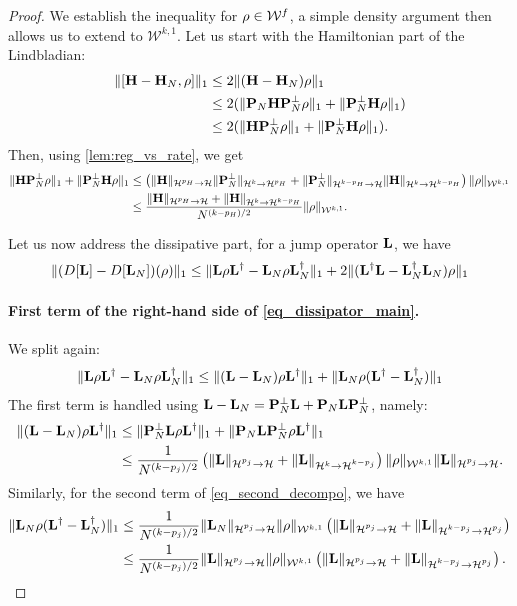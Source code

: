 \documentclass[10pt,a4paper]{amsart}
\newcommand{\oH}{{\bf H}}
\newcommand{\oL}{{\bf L}}
\newcommand{\oP}{{\bf P}}
\newcommand{\orho}{{\bf \rho}}
\newcommand{\xH}{\mathcal{H}}
\newcommand{\xW}{\mathcal{W}}
\begin{document}
\begin{proof}
    We establish the inequality for $\orho\in \xW^f$, a simple density argument then allows us to extend to $\xW^{k,1}$. Let us start with the Hamiltonian part of the Lindbladian:
    \begin{align}
        \|[\oH-\oH_N,\orho]\|_1 &\leq 2 \| (\oH-\oH_N)\orho\|_1\\
        & \leq 2 (\| \oP_N \oH \oP_N^\perp \orho \|_1 + \| \oP_N^\perp \oH \orho \|_1)\\
        & \leq 2 (\| \oH \oP_N^\perp \orho \|_1 + \| \oP_N^\perp \oH \orho \|_1).
    \end{align}
    Then, using \cref{lem:reg_vs_rate}, we get
    \begin{align}
        \| \oH \oP_N^\perp \orho \|_1+ \| \oP_N^\perp \oH \orho \|_1&
        \leq \left( \|\oH\|_{\xH^{p_H}\to \xH} \|\oP_N^\perp\|_{\xH^k \to \xH^{p_H}} + \|\oP_N^\perp\|_{\xH^{k-p_H}\to \xH} \|\oH\|_{\xH^{k}\to \xH^{k-p_H}} \right)\|\orho\|_{\xW^{k,1}}\\
        &\leq \frac{\|\oH\|_{\xH^{p_H}\to \xH}+\|\oH\|_{\xH^{k}\to \xH^{k-p_H}}}{N^{(k-p_H)/2}} \|\orho\|_{\xW^{k,1}}.
    \end{align}

    Let us now address the dissipative part, for a jump operator $\oL$, we have
    \begin{align}
        \label{eq_dissipator_main}
        \|(D[\oL]-D[\oL_N])(\orho)\|_1 \leq \|\oL \orho \oL^\dag - \oL_N\orho \oL_N^\dag\|_1 + 2\|(\oL^\dag \oL-\oL_N^\dag \oL_N)\orho\|_1
    \end{align}
    \paragraph{First term of the right-hand side of \cref{eq_dissipator_main}.} We split again:
    \begin{align}
        \label{eq_second_decompo}
        \|\oL \orho \oL^\dag -\oL_N\orho \oL_N^\dag\|_1\leq \|(\oL-\oL_N)\orho \oL^\dag\|_1 +\|\oL_N\orho (\oL^\dag-\oL_N^\dag)\|_1
    \end{align}
    The first term is handled using $ \oL -\oL_N= \oP_N^\perp \oL + \oP_N \oL \oP_N^\perp$, namely:
    \begin{align}
        \|(\oL-\oL_N)\orho \oL^\dag\|_1 & \leq \|\oP_N^\perp \oL \orho \oL^\dag\|_1+ \|\oP_N \oL \oP_N^\perp \orho \oL^\dag\|_1\\
        & \leq \frac{1}{N^{(k-p_j)/2}}\left( \|\oL \|_{\xH^{p_j}\to \xH}+\|\oL \|_{\xH^{k}\to \xH^{k-p_j}} \right) \|\orho\|_{\xW^{k,1}}\|\oL \|_{\xH^{p_j}\to \xH}.
    \end{align}
    Similarly, for the second term of \cref{eq_second_decompo}, we have
    \begin{align}
        \|\oL_N\orho (\oL^\dag- \oL_N^\dag)\|_1 &\leq \frac{1}{N^{(k-p_j)/2}}\|\oL_N\|_{\xH^{p_j}\to \xH} \|\orho\|_{\xW^{k,1}}\left(\|\oL \|_{\xH^{p_j}\to \xH}+\|\oL \|_{\xH^{k-p_j}\to \xH^{p_j}}\right) \\
        &\leq \frac{1}{N^{(k-p_j)/2}}\|\oL \|_{\xH^{p_j}\to \xH} \|\orho\|_{\xW^{k,1}} \left(\|\oL \|_{\xH^{p_j}\to \xH}+\|\oL \|_{\xH^{k-p_j}\to \xH^{p_j}}\right).
    \end{align}

\end{proof}
\end{document}
